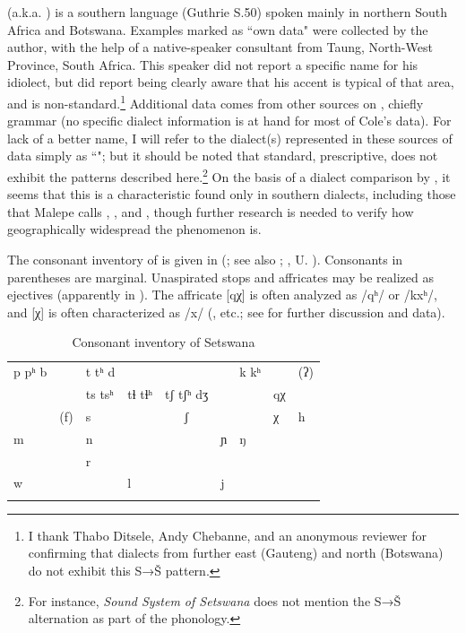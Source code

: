 \documentclass[output=paper,newtxmath,modfonts,nonflat]{langsci/langscibook}
\begin{document}
 (a.k.a. ) is a southern  language (Guthrie S.50) spoken mainly in northern South Africa and Botswana. Examples marked as ``own data" were collected by the author, with the help of a native-speaker consultant from Taung, North-West Province, South Africa. This speaker did not report a specific name for his idiolect, but did report being clearly aware that his accent is typical of that area, and is non-standard.\footnote{I thank Thabo Ditsele, Andy Chebanne, and an anonymous reviewer for confirming that  dialects from further east (Gauteng) and north (Botswana) do not exhibit this S→Š pattern.} Additional data comes from other sources on , chiefly  grammar (no specific dialect information is at hand for most of Cole’s data). For lack of a better name, I will refer to the dialect(s) represented in these sources of data simply as ``"; but it should be noted that standard, prescriptive,  does not exhibit the patterns described here.\footnote{For instance,  \textit{Sound System of Setswana} does not mention the S→Š alternation as part of the phonology.} On the basis of a dialect comparison by \citet{Malepe1966}, it seems that this is a characteristic found only in southern dialects, including those that Malepe calls , , and , though further research is needed to verify how geographically widespread the phenomenon is.

The consonant inventory of  is given in  %
 (\citealt{Bennett2016}; see also \citealt{Cole1955}; \citealt{chebanneetal1997}, U. \citealt{University-of-Botswana:2001aa}). Consonants in parentheses are marginal. Unaspirated stops and affricates may be realized as ejectives (apparently in ). The affricate [qχ] is often analyzed as /qʰ/ or /kxʰ/, and [χ] is often characterized as /x/ (\citealt{Cole1955}, etc.; see \citealt{Bennett2016} for further discussion and data).
 
\vspace{.05in}
\begin{table}
\begin{tabularx}{\textwidth}{XXXXcXXXX}
\lsptoprule

p pʰ   b &  & t   tʰ   d &  &  &  & k  kʰ &  & (ʔ)\\
&  & ts tsʰ & tɬ   tɬʰ & tʃ   tʃʰ dʒ &  &  & qχ & \\
& (f) & s &  & ʃ &  &  & χ & h \\
m &  & n &  &  & ɲ & ŋ &  & \\
&  & r &  &  &  &  &  & \\
w &  &  & l &  & j &  &  & \\
\lspbottomrule
\end{tabularx}
\caption{Consonant inventory of Setswana}
\label{tab:bennett:1}
\end{table}
\end{document}
